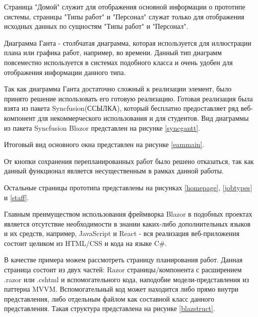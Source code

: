 Страница "Домой" служит для отображения основной информации о прототипе системы, страницы "Типы работ" и "Персонал" служат только для отображения исходных данных по сущностям "Типы работ" и "Персонал".

Диаграмма Ганта - столбчатая диаграмма, которая используется для иллюстрации плана или графика работ, например, во времени. Данный тип диаграмм повсеместно используется в системах подобного класса и очень удобен для отображения информации данного типа.

Так как диаграмма Ганта достаточно сложный к реализации элемент, было принято решение использовать его готовую реализацию. Готовая реализация была взята из пакета Syncfusion(ССЫЛКА), который бесплатно предоставляет ряд веб-компонент для некоммерческого использования и для студентов. Вид диаграммы из пакета Syncfusion Blazor представлен на рисунке \ref{syncgantt}.


Итоговый вид основного окна представлен на рисунке \ref{eammain}.


От кнопки сохранения перепланированных работ было решено отказаться, так как данный функционал является несущественным в рамках данной работы.

Остальные страницы прототипа представлены на рисунках \ref{homepage}, \ref{jobtypes} и \ref{staff}.




Главным преимуществом использования фреймворка Blazor в подобных проектах является отсутствие необходимости в знании каких-либо дополнительных языков и их средств, например, JavaScript и React - вся реализация веб-приложения состоит целиком из HTML/CSS и кода на языке C\#.

В качестве примера можем рассмотреть страницу планирования работ. Данная страница состоит из двух частей: Razor страницы/компонента с расширением .razor или .cshtml и вспомогательного кода, наподобие модели-представления из паттерна MVVM. Вспомогательный код может находится либо прямо внутри представления, либо отдельным файлом как составной класс данного представления. Такая структура представлена на рисунке \ref{blazstruct}.

